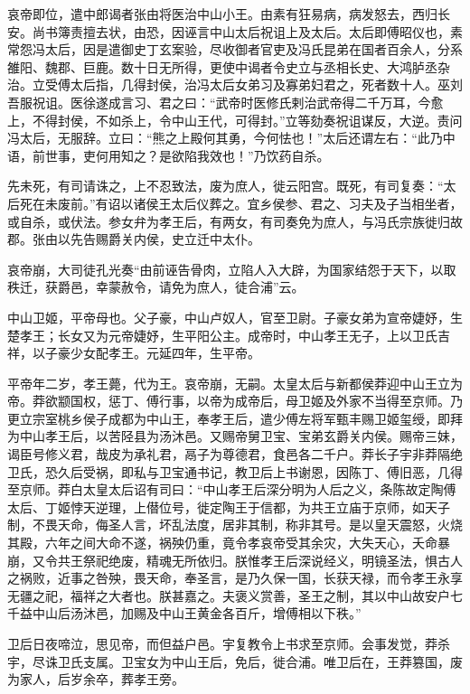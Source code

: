 \documentclass[]{article}
\begin{document}
哀帝即位，遣中郎谒者张由将医治中山小王。由素有狂易病，病发怒去，西归长安。尚书簿责擅去状，由恐，因诬言中山太后祝诅上及太后。太后即傅昭仪也，素常怨冯太后，因是遣御史丁玄案验，尽收御者官吏及冯氏昆弟在国者百余人，分系雒阳、魏郡、巨鹿。数十日无所得，更使中谒者令史立与丞相长史、大鸿胪丞杂治。立受傅太后指，几得封侯，治冯太后女弟习及寡弟妇君之，死者数十人。巫刘吾服祝诅。医徐遂成言习、君之曰：``武帝时医修氏剌治武帝得二千万耳，今愈上，不得封侯，不如杀上，令中山王代，可得封。''立等劾奏祝诅谋反，大逆。责问冯太后，无服辞。立曰：``熊之上殿何其勇，今何怯也！''太后还谓左右：``此乃中语，前世事，吏何用知之？是欲陷我效也！''乃饮药自杀。

先未死，有司请诛之，上不忍致法，废为庶人，徙云阳宫。既死，有司复奏：``太后死在未废前。''有诏以诸侯王太后仪葬之。宜乡侯参、君之、习夫及子当相坐者，或自杀，或伏法。参女弁为孝王后，有两女，有司奏免为庶人，与冯氏宗族徙归故郡。张由以先告赐爵关内侯，史立迁中太仆。

哀帝崩，大司徒孔光奏``由前诬告骨肉，立陷人入大辟，为国家结怨于天下，以取秩迁，获爵邑，幸蒙赦令，请免为庶人，徒合浦''云。

中山卫姬，平帝母也。父子豪，中山卢奴人，官至卫尉。子豪女弟为宣帝婕妤，生楚孝王；长女又为元帝婕妤，生平阳公主。成帝时，中山孝王无子，上以卫氏吉祥，以子豪少女配孝王。元延四年，生平帝。

平帝年二岁，孝王薨，代为王。哀帝崩，无嗣。太皇太后与新都侯莽迎中山王立为帝。莽欲颛国权，惩丁、傅行事，以帝为成帝后，母卫姬及外家不当得至京师。乃更立宗室桃乡侯子成都为中山王，奉孝王后，遣少傅左将军甄丰赐卫姬玺绶，即拜为中山孝王后，以苦陉县为汤沐邑。又赐帝舅卫宝、宝弟玄爵关内侯。赐帝三妹，谒臣号修义君，哉皮为承礼君，鬲子为尊德君，食邑各二千户。莽长子宇非莽隔绝卫氏，恐久后受祸，即私与卫宝通书记，教卫后上书谢恩，因陈丁、傅旧恶，几得至京师。莽白太皇太后诏有司曰：``中山孝王后深分明为人后之义，条陈故定陶傅太后、丁姬悖天逆理，上僣位号，徙定陶王于信都，为共王立庙于京师，如天子制，不畏天命，侮圣人言，坏乱法度，居非其制，称非其号。是以皇天震怒，火烧其殿，六年之间大命不遂，祸殃仍重，竟令孝哀帝受其余灾，大失天心，夭命暴崩，又令共王祭祀绝废，精魂无所依归。朕惟孝王后深说经义，明镜圣法，惧古人之祸败，近事之咎殃，畏天命，奉圣言，是乃久保一国，长获天禄，而令孝王永享无疆之祀，福祥之大者也。朕甚嘉之。夫褒义赏善，圣王之制，其以中山故安户七千益中山后汤沐邑，加赐及中山王黄金各百斤，增傅相以下秩。''

卫后日夜啼泣，思见帝，而但益户邑。宇复教令上书求至京师。会事发觉，莽杀宇，尽诛卫氏支属。卫宝女为中山王后，免后，徙合浦。唯卫后在，王莽篡国，废为家人，后岁余卒，葬孝王旁。
\end{document}
